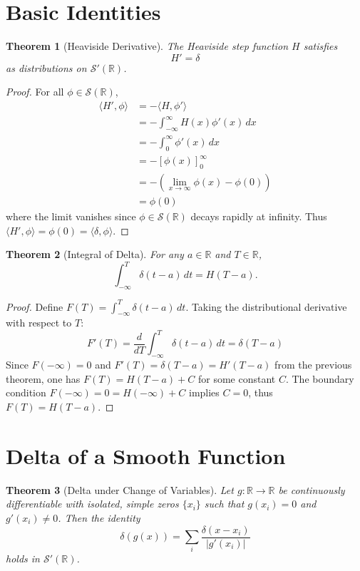 \documentclass[11pt]{article}
\newtheorem{theorem}{Theorem}
\begin{document}
\section{Basic Identities}

\begin{theorem}[Heaviside Derivative]
The Heaviside step function $H$ satisfies
\[
H' = \delta
\]
as distributions on $\mathcal{S}'(\mathbb{R})$.
\end{theorem}

\begin{proof}
For all $\phi \in \mathcal{S}(\mathbb{R})$,
\begin{align}
\langle H', \phi \rangle &= -\langle H, \phi' \rangle \\
&= -\int_{-\infty}^{\infty} H(x) \phi'(x) \, dx \\
&= -\int_{0}^{\infty} \phi'(x) \, dx \\
&= -[\phi(x)]_{0}^{\infty} \\
&= -(\lim_{x \to \infty} \phi(x) - \phi(0)) \\
&= \phi(0)
\end{align}
where the limit vanishes since $\phi \in \mathcal{S}(\mathbb{R})$ decays rapidly at infinity. Thus $\langle H', \phi \rangle = \phi(0) = \langle \delta, \phi \rangle$.
\end{proof}

\begin{theorem}[Integral of Delta]
For any $a \in \mathbb{R}$ and $T \in \mathbb{R}$,
\[
\int_{-\infty}^T \delta(t - a) \, dt = H(T - a).
\]
\end{theorem}

\begin{proof}
Define $F(T) = \int_{-\infty}^T \delta(t - a) \, dt$. Taking the distributional derivative with respect to $T$:
\[
F'(T) = \frac{d}{dT} \int_{-\infty}^T \delta(t - a) \, dt = \delta(T - a)
\]
Since $F(-\infty) = 0$ and $F'(T) = \delta(T - a) = H'(T - a)$ from the previous theorem, one has $F(T) = H(T - a) + C$ for some constant $C$. The boundary condition $F(-\infty) = 0 = H(-\infty) + C$ implies $C = 0$, thus $F(T) = H(T - a)$.
\end{proof}

\section{Delta of a Smooth Function}

\begin{theorem}[Delta under Change of Variables]
Let $g: \mathbb{R} \to \mathbb{R}$ be continuously differentiable with isolated, simple zeros $\{x_i\}$ such that $g(x_i)=0$ and $g'(x_i) \neq 0$.
Then the identity
\[
\delta(g(x)) = \sum_i \frac{\delta(x - x_i)}{|g'(x_i)|}
\]
holds in $\mathcal{S}'(\mathbb{R})$.
\end{theorem}
\end{document}
